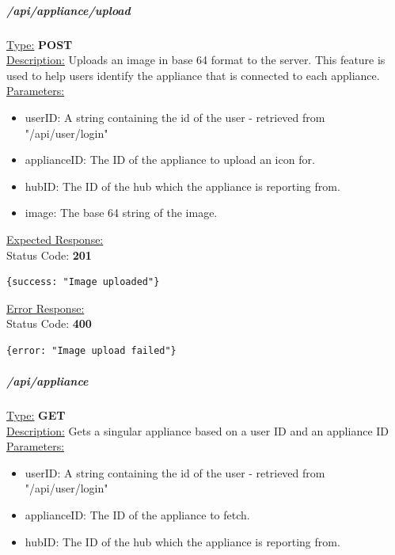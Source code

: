 \documentclass[preprint,12pt,3p]{elsarticle}
\newcommand{\forceindent}{\leavevmode{\parindent=1em\indent}}
\begin{document}
\subparagraph*{/api/appliance/upload}
\underline{Type:} \textbf{POST}\\

\underline{Description:} Uploads an image in base 64 format to the server. This feature is used to help users identify the appliance that is connected to each appliance.\\

\underline{Parameters:}
\begin{itemize}
\item userID: A string containing the id of the user - retrieved from "/api/user/login"

\item applianceID: The ID of the appliance to upload an icon for.

\item hubID: The ID of the hub which the appliance is reporting from.

\item image: The base 64 string of the image.
\end{itemize}

\underline{Expected Response:}\\[5pt]
\forceindent Status Code: \textbf{201} \\
\begin{verbatim}
{success: "Image uploaded"}
\end{verbatim}
\underline{Error Response:}\\[5pt]
\forceindent Status Code: \textbf{400} \\
\begin{verbatim}
{error: "Image upload failed"}
\end{verbatim}

\subparagraph*{/api/appliance}
\underline{Type:} \textbf{GET}\\

\underline{Description:} Gets a singular appliance based on a user ID and an appliance ID\\

\underline{Parameters:}
\begin{itemize}
\item userID: A string containing the id of the user - retrieved from "/api/user/login"

\item applianceID: The ID of the appliance to fetch.

\item hubID: The ID of the hub which the appliance is reporting from.

\end{itemize}
\end{document}
